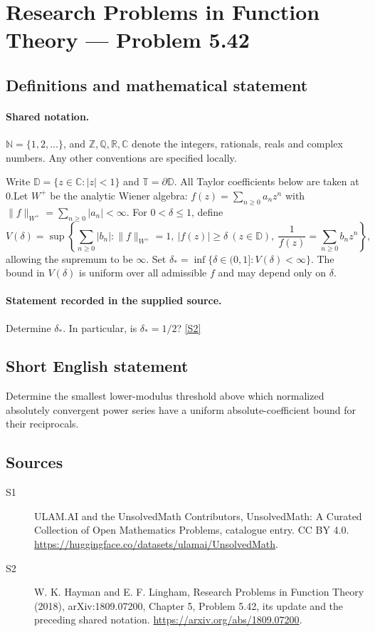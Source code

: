 \documentclass[11pt]{article}
\newcommand{\sref}[2]{\hyperlink{source:#1:#2}{[S#2]}}
\begin{document}
\section{Research Problems in Function Theory — Problem 5.42}\label{statement}

\subsection{Definitions and mathematical statement}

\paragraph{Shared notation.}$\mathbb N=\{1,2,\ldots\}$, and $\mathbb Z,\mathbb Q,\mathbb R,\mathbb C$ denote the integers, rationals, reals and complex numbers. Any other conventions are specified locally.


Write $\mathbb D=\{z\in\mathbb C:|z|<1\}$ and $\mathbb T=\partial\mathbb D$. All Taylor coefficients below are taken at $0$.Let $W^+$ be the analytic Wiener algebra: $f(z)=\sum_{n\ge0}a_nz^n$ with $\|f\|_{W^+}=\sum_{n\ge0}|a_n|<\infty$. For $0<\delta\le1$, define
\[V(\delta)=\sup\left\{\sum_{n\ge0}|b_n|:\|f\|_{W^+}=1,\ |f(z)|\ge\delta\ (z\in\mathbb D),\ \frac1{f(z)}=\sum_{n\ge0}b_nz^n\right\},
\]
allowing the supremum to be $\infty$. Set $\delta_* =\inf\{\delta\in(0,1]:V(\delta)<\infty\}$. The bound in $V(\delta)$ is uniform over all admissible $f$ and may depend only on $\delta$.
\paragraph{Statement recorded in the supplied source.}
Determine $\delta_*$. In particular, is $\delta_*=1/2$? \sref{statement}{2}
\subsection{Short English statement}
Determine the smallest lower-modulus threshold above which normalized absolutely convergent power series have a uniform absolute-coefficient bound for their reciprocals.
\subsection{Sources}
\begin{description}
\item[\hypertarget{source:statement:1}{S1}] ULAM.AI and the UnsolvedMath Contributors, UnsolvedMath: A Curated Collection of Open Mathematics Problems, catalogue entry. CC BY 4.0. \url{https://huggingface.co/datasets/ulamai/UnsolvedMath}.
\item[\hypertarget{source:statement:2}{S2}] W. K. Hayman and E. F. Lingham, Research Problems in Function Theory (2018), arXiv:1809.07200, Chapter 5, Problem 5.42, its update and the preceding shared notation. \url{https://arxiv.org/abs/1809.07200}.
\end{description}
\label{end:statement}
\end{document}

